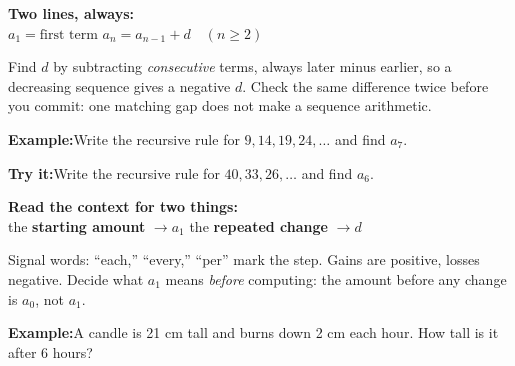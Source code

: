 \documentclass[12pt]{article}
\begin{document}


\begin{formulabox}
\textbf{Two lines, always:}\\[4pt]
$a_1 = \text{first term}$ \qquad $a_n = a_{n-1} + d \quad (n \ge 2)$\par
\smallskip
Find $d$ by subtracting \emph{consecutive} terms, always later minus earlier, so
a decreasing sequence gives a negative $d$. Check the same difference twice
before you commit: one matching gap does not make a sequence arithmetic.
\end{formulabox}

\begin{examplebox}
\textbf{Example:}\quad Write the recursive rule for $9, 14, 19, 24, \ldots$ and
find $a_7$.
\end{examplebox}

\begin{tryitbox}
\textbf{Try it:}\quad Write the recursive rule for $40, 33, 26, \ldots$ and find
$a_6$.\\[2pt]
\end{tryitbox}


\begin{formulabox}
\textbf{Read the context for two things:}\\[4pt]
the \textbf{starting amount} $\rightarrow a_1$ \qquad the \textbf{repeated
change} $\rightarrow d$\par
\smallskip
Signal words: ``each,'' ``every,'' ``per'' mark the step. Gains are positive,
losses negative. Decide what $a_1$ means \emph{before} computing: the amount
before any change is $a_0$, not $a_1$.
\end{formulabox}

\begin{examplebox}
\textbf{Example:}\quad A candle is 21 cm tall and burns down 2 cm each hour. How
tall is it after 6 hours?
\end{examplebox}
\end{document}
